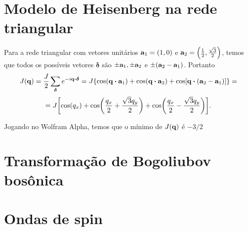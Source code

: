 \documentclass[a4paper,10pt]{article}
\begin{document}
\pagebreak

\section{Modelo de Heisenberg na rede triangular}

Para a rede triangular com vetores unitários $\vb{a}_1 = (1,0)$ e $\vb{a}_2 = \qty(\frac{1}{2}, \frac{\sqrt{3}}{2})$, temos que todos os possíveis vetores $\bm{\delta}$ são $\pm\vb{a}_1, \pm\vb{a}_2$ e $\pm (\vb{a}_2 - \vb{a}_1)$. Portanto
$$
J(\q) = \frac{J}{2} \sum_{\bm{\delta}} e^{-i \q \vdot \bm{\delta}} =
J \qty{\cos(\q \vdot \vb{a}_1) + \cos(\q \vdot \vb{a}_2) + \cos[\q \vdot (\vb{a}_2 - \vb{a}_1)]} =
$$
$$
= J \qty[\cos(q_x) + \cos(\frac{q_x}{2} + \frac{\sqrt{3} q_y}{2}) + \cos(\frac{q_x}{2} - \frac{\sqrt{3} q_y}{2})].
$$

Jogando no Wolfram Alpha, temos que o mínimo de $J(\vb{q})$ é $-3/2$




\pagebreak

\section{Transformação de Bogoliubov bosônica}



\pagebreak

\section{Ondas de spin}
\end{document}

